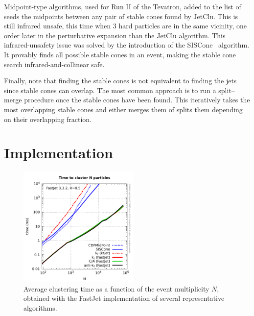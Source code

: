 Midpoint-type algorithms, used for Run II of the Tevatron, added to
the list of seeds the midpoints between any pair of stable cones found
by JetClu. This is still infrared unsafe, this time when 3 hard
particles are in the same vicinity, \ie one order later in the
perturbative expansion than the JetClu algorithm.
%
This infrared-unsafety issue was solved by the introduction of the
SISCone~\cite{Salam:2007xv} algorithm. It provably finds all possible
stable cones in an event, making the stable cone search
infrared-and-collinear safe.

Finally,  note that finding the stable cones is
not equivalent to finding the jets since stable cones can overlap.
%
The most common approach is to run a split--merge procedure once the
stable cones have been found. This iteratively takes the most
overlapping stable cones and either merges them of splits them depending
on their overlapping fraction.



\section{Implementation}\label{sec:jetdefs-implementation}
\begin{figure}
  \includegraphics[width=0.53\textwidth]{figures/fastjet-timings.pdf}
  \hspace*{0.4cm}
  \begin{minipage}[b]{0.38\textwidth}
    \caption{Average clustering time as a function of the event
      multiplicity $N$, obtained with the FastJet implementation of
      several representative algorithms.}\label{fig:fastjet-timings}
    \vspace*{1.4cm}
  \end{minipage}  
\end{figure}


